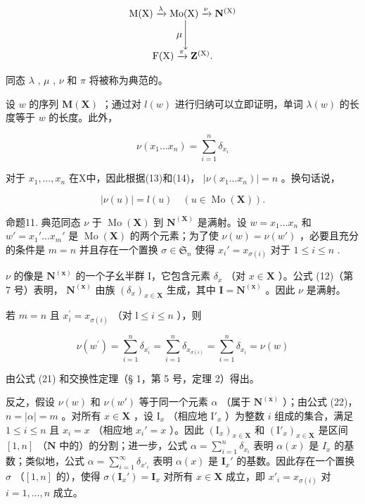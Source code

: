\[
\begin{array}{c} \mathrm{M} (\mathrm{X}) \xrightarrow {\lambda} \mathrm{Mo} (\mathrm{X}) \xrightarrow {\nu} \mathbf {N} ^ {(\mathrm{X})} \\ \mu \Biggl \downarrow \\ \mathrm{F} (\mathrm{X}) \xrightarrow {\pi} \mathbf {Z} ^ {(\mathrm{X})}. \end{array}
\]

同态 \(\lambda\) , \(\mu\) , \(\nu\) 和 \(\pi\) 将被称为典范的。

设 \(w\) 的序列 \(\mathbf{M}(\mathbf{X})\) ；通过对 \(l(w)\) 进行归纳可以立即证明，单词 \(\lambda(w)\) 的长度等于 \(w\) 的长度。此外，

\[
\nu (x _ {1} \dots x _ {n}) = \sum_ {i = 1} ^ {n} \delta_ {x _ {i}}\tag{21}
\]

对于 \(x_1, \ldots, x_n\) 在X中，因此根据(13)和(14)， \(|\nu(x_1 \ldots x_n)| = n\) 。换句话说，

\[
\left| \nu (u) \right| = l (u) \quad (u \in \operatorname{Mo} (\mathbf {X})).\tag{22}
\]

命题11. 典范同态 \(\nu\) 于 \(\operatorname{Mo}(\mathbf{X})\) 到 \(\mathbf{N}^{(\mathbf{X})}\) 是满射。设 \(w = x_1 \ldots x_n\) 和 \(w' = x_1' \ldots x_m'\) 是 \(\operatorname{Mo}(\mathbf{X})\) 的两个元素；为了使 \(\nu(w) = \nu(w')\) ，必要且充分的条件是 \(m = n\) 并且存在一个置换 \(\sigma \in \mathfrak{S}_n\) 使得 \(x_i' = x_{\sigma(i)}\) 对于 \(1 \leqslant i \leqslant n\) .

\(\nu\) 的像是 \(\mathbf{N}^{(\mathbf{x})}\) 的一个子幺半群 I，它包含元素 \(\delta_x\) （对 \(x \in \mathbf{X}\) ）。公式 (12)（第 7 号）表明， \(\mathbf{N}^{(\mathbf{x})}\) 由族 \((\delta_x)_{x \in \mathbf{X}}\) 生成，其中 \(\mathbf{I} = \mathbf{N}^{(\mathbf{x})}\) 。因此 \(\nu\) 是满射。

若 \(m = n\) 且 \(x_{i}^{\prime} = x_{\sigma (i)}\) （对 \(\mathrm{l}\leqslant i\leqslant n\) ），则

\[
\nu (w ^ {\prime}) = \sum_ {i = 1} ^ {n} \delta_ {x _ {i} ^ {\prime}} = \sum_ {i = 1} ^ {n} \delta_ {x _ {\sigma (i)}} = \sum_ {i = 1} ^ {n} \delta_ {x _ {i}} = \nu (w)
\]

由公式 (21) 和交换性定理（§ 1，第 5 号，定理 2）得出。

反之，假设 \(\nu(w)\) 和 \(\nu(w')\) 等于同一个元素 \(\alpha\) （属于 \(\mathbf{N}^{(\mathbf{x})}\) ）；由公式 (22)， \(n = |\alpha| = m\) 。对所有 \(x \in \mathbf{X}\) ，设 \(\mathrm{I}_x\) （相应地 \(\mathrm{I}'_x\) ）为整数 \(i\) 组成的集合，满足 \(1 \leqslant i \leqslant n\) 且 \(x_i = x\) （相应地 \(x_i' = x\) ）。因此 \((\mathrm{I}_x)_{x \in \mathbf{X}}\) 和 \((\mathrm{I}'_x)_{x \in \mathbf{X}}\) 是区间 \([1, n]\) （\(\mathbf{N}\) 中的）的分割；进一步，公式 \(\alpha = \sum_{i=1}^{n} \delta_{x_i}\) 表明 \(\alpha(x)\) 是 \(I_x\) 的基数；类似地，公式 \(\alpha = \sum_{i=1}^{\infty} \delta_{x'_i}\) 表明 \(\alpha(x)\) 是 \(\mathbf{I}_x'\) 的基数。因此存在一个置换 \(\sigma\) （\([1, n]\) 的），使得 \(\sigma(\mathbf{I}_x') = \mathbf{I}_x\) 对所有 \(x \in \mathbf{X}\) 成立，即 \(x'_i = x_{\sigma(i)}\) 对 \(i = 1, \ldots, n\) 成立。

